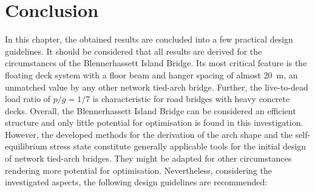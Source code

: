 \chapter{Conclusion}\label{sec:conclusion}
In this chapter, the obtained results are concluded into a few practical design guidelines. It should be considered that all results are derived for the circumstances of the Blennerhassett Island Bridge. Its most critical feature is the floating deck system with a floor beam and hanger spacing of almost \SI{20}{m}, an unmatched value by any other network tied-arch bridge. Further, the live-to-dead load ratio of $p/g=1/7$ is characteristic for road bridges with heavy concrete decks. Overall, the Blennerhassett Island Bridge can be considered an efficient structure and only little potential for optimisation is found in this investigation. However, the developed methods for the derivation of the arch shape and the self-equilibrium stress state constitute generally applicable tools for the initial design of network tied-arch bridges. They might be adapted for other circumstances rendering more potential for optimisation. Nevertheless, considering the investigated aspects, the following design guidelines are recommended:

